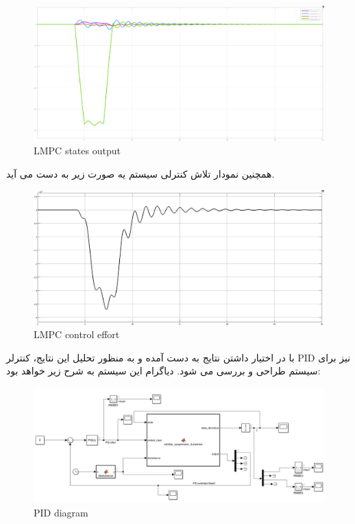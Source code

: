 \begin{figure}[H]
	\centering
	\includegraphics[width=1\linewidth]{../img/6}
	\caption{LMPC states output}
	\label{fig:6}
\end{figure}
همچنین نمودار تلاش کنترلی سیستم یه صورت زیر به دست می آید.

\begin{figure}[H]
	\centering
	\includegraphics[width=1\linewidth]{../img/7}
	\caption{LMPC control effort}
	\label{fig:7}
\end{figure}

با در اختیار داشتن نتایج به دست آمده و به منظور تحلیل این نتایج، کنترلر PID نیز برای سیستم طراحی و بررسی می شود. دیاگرام این سیستم به شرح زیر خواهد بود:

\begin{figure}[H]
	\centering
	\includegraphics[width=1\linewidth]{../img/8}
	\caption{PID diagram}
	\label{fig:8}
\end{figure}

